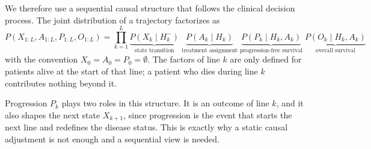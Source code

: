 \documentclass[a4paper,10pt]{article}
\begin{document}
We therefore use a sequential causal structure that follows the clinical decision process. The joint distribution of a trajectory factorizes as
\begin{equation}
    P(X_{1:L}, A_{1:L}, P_{1:L}, O_{1:L})
    = \prod_{k=1}^{L}
    \underbrace{P(X_k \mid H_k^-)}_{\text{state transition}} \;
    \underbrace{P(A_k \mid H_k)}_{\text{treatment assignment}} \;
    \underbrace{P(P_k \mid H_k, A_k)}_{\text{progression-free survival}} \;
    \underbrace{P(O_k \mid H_k, A_k)}_{\text{overall survival}}
    \label{eq:factorization}
\end{equation}
with the convention $X_0 = A_0 = P_0 = \emptyset$. The factors of line $k$ are only defined for patients alive at the start of that line; a patient who dies during line $k$ contributes nothing beyond it.

Progression $P_k$ plays two roles in this structure. It is an outcome of line $k$, and it also shapes the next state $X_{k+1}$, since progression is the event that starts the next line and redefines the disease status. This is exactly why a static causal adjustment is not enough and a sequential view is needed.
\end{document}

